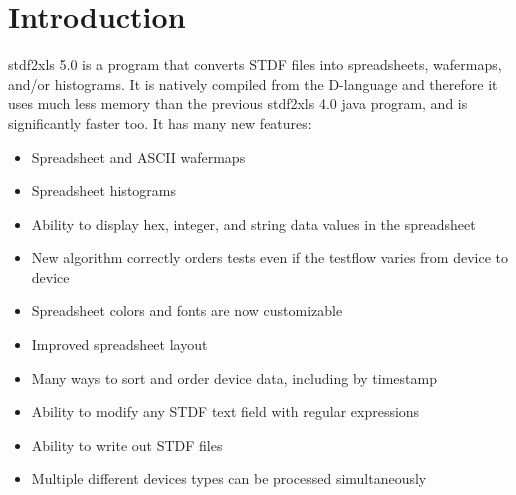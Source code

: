 \documentclass[letterpaper]{article}
\begin{document}
\selectfont
\newcommand{\tfont}{\usefont{T1}{ua1}{m}{n}\selectfont\footnotesize}
\newcommand{\bfont}{\usefont{T1}{ua1}{b}{n}\selectfont\tiny}
\newcommand{\xfont}{\usefont{T1}{ua1}{m}{n}\selectfont\scriptsize}
\newcommand{\lfont}{\usefont{T1}{ua1}{m}{n}\selectfont\large}
\renewcommand{\captionfont}{\it }
\renewcommand{\date}{February 26, 2020}
\newcommand{\ver}{V1.0}
\newcommand{\tablecap}{\hline\end{tabular}\end{table}\end{center}}
\renewcommand{\versionhistory}{
\vspace*{1in}
\begin{center}
\begin{table}[H]\caption*{Revision History}
\centering
\xfont\begin{tabular}[H]{|c|c|c|c|}
\hline
{\bf Version} & {\bf Author} & {\bf Date} & {\bf Changes}\\
\hline
\hline
1.0 & Eric West & 2/26/20 & Initial Release \\
\hline
\end{tabular}
\end{table}
\end{center}
}
\maketitle
\setcounter{tocdepth}{3}
\tableofcontents
\clearpage
\makebg

\section{\bf Introduction}
stdf2xls 5.0 is a program that converts STDF files into spreadsheets, wafermaps, and/or histograms.
It is natively compiled from the D-language and therefore it uses much less memory than the previous
stdf2xls 4.0 java program, and is significantly faster too.  It has many new features:
\begin{itemize}
\item Spreadsheet and ASCII wafermaps
\item Spreadsheet histograms
\item Ability to display hex, integer, and string data values in the spreadsheet
\item New algorithm correctly orders tests even if the testflow varies from device to device
\item Spreadsheet colors and fonts are now customizable
\item Improved spreadsheet layout
\item Many ways to sort and order device data, including by timestamp
\item Ability to modify any STDF text field with regular expressions
\item Ability to write out STDF files
\item Multiple different devices types can be processed simultaneously
\end{itemize}
\end{document}
